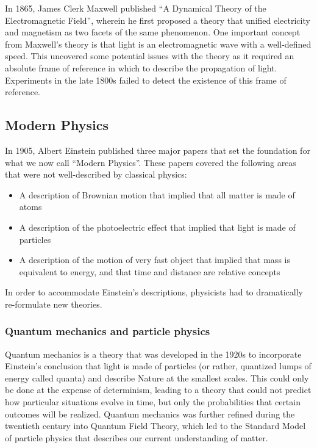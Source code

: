 In 1865, James Clerk Maxwell published ``A Dynamical Theory of the Electromagnetic Field'', wherein he first proposed a theory that unified electricity and magnetism as two facets of the same phenomenon. One important concept from Maxwell's theory is that light is an electromagnetic wave with a well-defined speed. This uncovered some potential issues with the theory as it required an absolute frame of reference in which to describe the propagation of light. Experiments in the late 1800s failed to detect the existence of this frame of reference.

\subsection{Modern Physics}
In 1905, Albert Einstein published three major papers that set the foundation for what we now call ``Modern Physics''. These papers covered the following areas that were not well-described by classical physics:
\begin{itemize}
\item A description of Brownian motion that implied that all matter is made of atoms
\item A description of the photoelectric effect that implied that light is made of particles
\item A description of the motion of very fast object that implied that mass is equivalent to energy, and that time and distance are relative concepts
\end{itemize}
In order to accommodate Einstein's descriptions, physicists had to dramatically re-formulate new theories. 

\subsubsection{Quantum mechanics and particle physics}
Quantum mechanics is a theory that was developed in the 1920s to incorporate Einstein's conclusion that light is made of particles (or rather, quantized lumps of energy called quanta) and describe Nature at the smallest scales. This could only be done at the expense of determinism, leading to a theory that could not predict how particular situations evolve in time, but only the probabilities that certain outcomes will be realized. Quantum mechanics was further refined during the twentieth century into Quantum Field Theory, which led to the Standard Model of particle physics that describes our current understanding of matter. 

